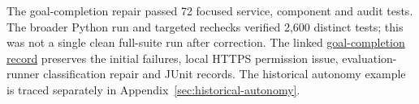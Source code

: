 The goal-completion repair passed 72 focused service, component and audit tests.
The broader Python run and targeted rechecks verified 2,600 distinct tests;
this was not a single clean full-suite run after correction. The linked
\hyperref[study-H]{goal-completion record} preserves the initial failures,
local HTTPS permission issue, evaluation-runner classification repair and JUnit
records. The historical autonomy example is traced separately in
Appendix~\ref{sec:historical-autonomy}.



\clearpage

\clearpage




